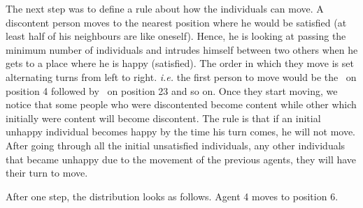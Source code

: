 \documentclass[../main.tex]{subfiles}
\begin{document}
\begin{table}[H]
\begin{center}
\end{center}
\caption*{The dot represents a discontent agent} 
\end{table}

The next step was to define a rule about how the individuals can move. A discontent person moves to the nearest position where he would be satisfied (at least half of his neighbours are like oneself). Hence, he is looking at passing the minimum number of individuals and intrudes himself between two others when he gets to a place where he is happy (satisfied). The order in which they move is set alternating turns from left to right. \textit{i.e.} the first person to move would be the \z\ on position 4 followed by \x\ on position 23 and so on. Once they start moving, we notice that some people who were discontented become content while other which initially were content will become discontent. The rule is that if an initial unhappy individual becomes happy by the time his turn comes, he will not move. After going through all the initial unsatisfied individuals, any other individuals that became unhappy due to the movement of the previous agents, they will have their turn to move.

After one step, the distribution looks as follows. Agent 4 moves to position 6.
\begin{table}[H]
\begin{center}
\end{center}
\end{table}
\end{document}
